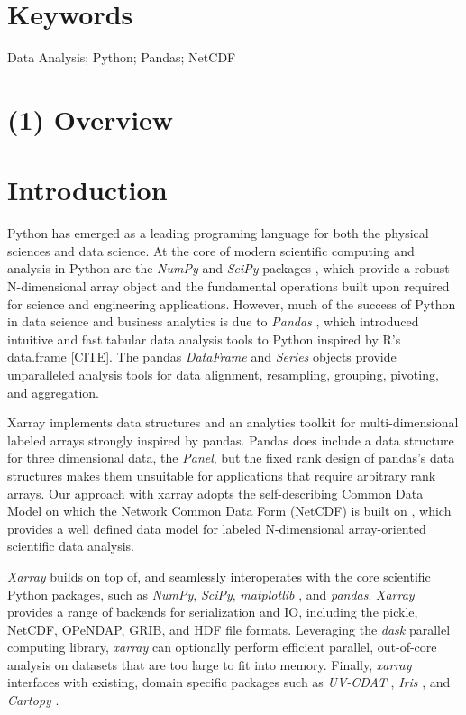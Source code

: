 \documentclass{jors}
\begin{document}
\section*{Keywords}

{Data Analysis; Python; Pandas; NetCDF}

\section*{(1) Overview}

\section*{Introduction}


Python has emerged as a leading programing language for both the physical sciences and data science.
At the core of modern scientific computing and analysis in Python are the \textit{NumPy} and \textit{SciPy} packages \citep{Jones_2001,van_der_Walt_2011}, which provide a robust N-dimensional array object and the fundamental operations built upon required for science and engineering applications.
However, much of the success of Python in data science and business analytics is
due to \textit{Pandas} \citep{mckinney_2010}, which introduced intuitive and fast tabular data analysis tools to Python inspired by R's data.frame [CITE].
The pandas \textit{DataFrame} and \textit{Series} objects provide unparalleled analysis tools for data alignment, resampling, grouping, pivoting, and aggregation.


Xarray implements data structures and an analytics toolkit for multi-dimensional
labeled arrays strongly inspired by pandas.
Pandas does include a data structure for three dimensional data, the \textit{Panel}, but the fixed rank design of pandas's data structures makes them unsuitable for applications that require arbitrary rank arrays.
Our approach with xarray adopts the self-describing Common Data Model on which the Network Common Data Form (NetCDF) is built on \citep{Rew_1990,Brown_1993}, which provides a well defined data model for labeled N-dimensional array-oriented scientific data analysis.

\textit{Xarray} builds on top of, and seamlessly interoperates with the core scientific Python packages, such as \textit{NumPy}, \textit{SciPy}, \textit{matplotlib} \citep{Hunter_2007}, and \textit{pandas}.
\textit{Xarray} provides a range of backends for serialization and IO, including the pickle, NetCDF, OPeNDAP, GRIB, and HDF file formats.
Leveraging the \textit{dask} parallel computing library, \textit{xarray} can optionally perform efficient parallel, out-of-core analysis on datasets that are too large to fit into memory.
Finally, \textit{xarray} interfaces with existing, domain specific packages such as \textit{UV-CDAT} \citep{uvcdat}, \textit{Iris} \citep{Iris}, and \textit{Cartopy} \citep{Cartopy}.
\end{document}
